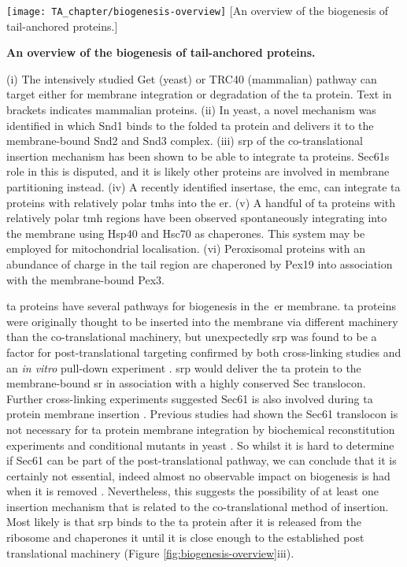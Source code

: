 \begin{sidewaysfigure}
\centering
\texttt{[image: TA\_chapter/biogenesis-overview]}
        [An overview of the biogenesis of tail-anchored proteins.]{\textbf{An overview of the biogenesis of tail-anchored proteins.}

        (i) The intensively studied Get (yeast) or TRC40 (mammalian) pathway can target either for membrane integration or degradation of the \gls{ta} protein.
        Text in brackets indicates mammalian proteins.
        (ii) In yeast, a novel mechanism was identified in which Snd1 binds to the folded \gls{ta} protein and delivers it to the membrane\--bound Snd2 and Snd3 complex.
        (iii) \gls{srp} of the co-translational insertion mechanism has been shown to be able to integrate \gls{ta} proteins. Sec61s role in this is disputed, and it is likely other proteins are involved in membrane partitioning instead.
        (iv) A recently identified insertase, the \gls{emc}, can integrate \gls{ta} proteins with relatively polar \gls{tmh}s into the \gls{er}.
        (v) A handful of \gls{ta} proteins with relatively polar \gls{tmh} regions have been observed spontaneously integrating into the membrane using Hsp40 and Hsc70 as chaperones.
        This system may be employed for mitochondrial localisation.
        (vi) Peroxisomal proteins with an abundance of charge in the tail region are chaperoned by Pex19 into association with the membrane\--bound Pex3.
}

\label{fig:biogenesis-overview}
\end{sidewaysfigure}

\gls{ta} proteins have several pathways for biogenesis in the~\gls{er} membrane.
\gls{ta} proteins were originally thought to be inserted into the membrane via different machinery than the co-translational machinery, but unexpectedly \gls{srp} was found to be a factor for post\--translational targeting confirmed by both cross-linking studies \cite{Abell2004} and an \textit{in vitro} pull-down experiment \cite{Leznicki2010}.
\gls{srp} would deliver the \gls{ta} protein to the membrane\--bound \gls{sr} in association with a highly conserved Sec translocon.
Further cross-linking experiments suggested Sec61 is also involved during \gls{ta} protein membrane insertion \cite{Abell2003}.
Previous studies had shown the Sec61 translocon is not necessary for \gls{ta} protein membrane integration by biochemical reconstitution experiments \cite{Kutay1993} and conditional mutants in yeast \cite{Steel2002, Yabal2003}.
So whilst it is hard to determine if Sec61 can be part of the post\--translational pathway, we can conclude that it is certainly not essential, indeed almost no observable impact on biogenesis is had when it is removed \cite{Kutay1993, Steel2002, Yabal2003}.
Nevertheless, this suggests the possibility of at least one insertion mechanism that is related to the co-translational method of insertion.
Most likely is that \gls{srp} binds to the \gls{ta} protein after it is released from the ribosome and chaperones it until it is close enough to the established post translational machinery \cite{Casson2017} (Figure \ref{fig:biogenesis-overview}iii).

